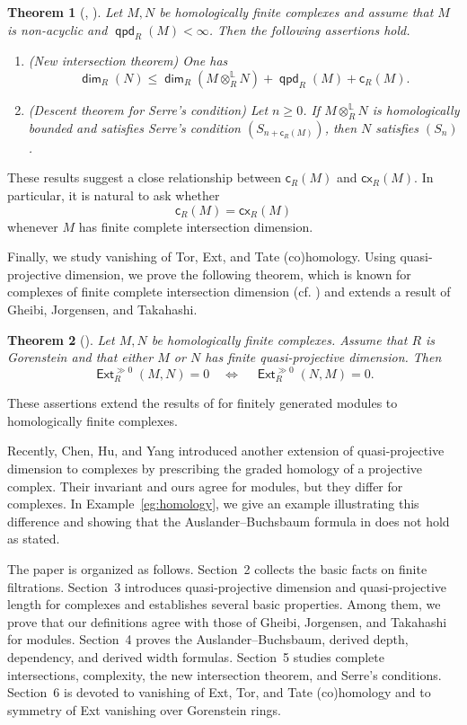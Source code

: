 \documentclass[10pt, a4paper,reqno]{amsart}
\newtheorem{thm}{Theorem}[section]
\theoremstyle{definition}
\theoremstyle{remark}
\numberwithin{equation}{thm}
\def\c{\mathsf{c}}
\def\dim{\operatorname{\mathsf{dim}}}
\def\Ext{\operatorname{\mathsf{Ext}}}
\def\ltensor{\otimes^{\mathbb{L}}}
\def\cx{\mathsf{cx}}
\def\qpd{\operatorname{\mathsf{qpd}}}
\begin{document}
\begin{thm}[, ]
Let $M,N$ be homologically finite complexes and assume that $M$ is non-acyclic and $\qpd_R(M)<\infty$.
Then the following assertions hold.
\begin{enumerate}[\rm(1)]
\item
{\rm(New intersection theorem)}
One has
\[
\dim_R(N)
\leq
\dim_R(M\ltensor_RN)
+\qpd_R(M)+\c_R(M).
\]

\item {\rm(Descent theorem for Serre's condition)}
Let $n\geq0$.
If $M\ltensor_RN$ is homologically bounded and satisfies Serre's condition
$(S_{n+\c_R(M)})$, then $N$ satisfies $(S_n)$.
\end{enumerate}
\end{thm}

These results suggest a close relationship between $\c_R(M)$ and $\cx_R(M)$.
In particular, it is natural to ask whether
\[
\c_R(M)=\cx_R(M)
\]
whenever $M$ has finite complete intersection dimension.

Finally, we study vanishing of Tor, Ext, and Tate (co)homology.
Using quasi-projective dimension, we prove the following theorem, which is known for complexes of finite complete intersection dimension (cf. \cite[Theorem 4.1]{Jor}) and extends a result of Gheibi, Jorgensen, and Takahashi. 

\begin{thm}[]
Let $M,N$ be homologically finite complexes.
Assume that $R$ is Gorenstein and that either $M$ or $N$ has finite quasi-projective dimension.
Then
\[
\Ext_R^{\gg0}(M,N)=0
\quad\Longleftrightarrow\quad
\Ext_R^{\gg0}(N,M)=0.
\]
\end{thm}
\noindent
These assertions extend the results of \cite{GJT} for finitely generated modules to homologically finite complexes.

Recently, Chen, Hu, and Yang \cite{CHY} introduced another extension of quasi-projective dimension to complexes by prescribing the graded homology of a projective complex.
Their invariant and ours agree for modules, but they differ for complexes.
In Example~\ref{eg:homology}, we give an example illustrating this difference and showing that the Auslander--Buchsbaum formula in \cite[Theorem~4.4]{CHY} does not hold as stated.

The paper is organized as follows.
Section~2 collects the basic facts on finite filtrations.
Section~3 introduces quasi-projective dimension and quasi-projective length for complexes and establishes several basic properties. 
Among them, we prove that our definitions agree with those of Gheibi, Jorgensen, and Takahashi for modules. 
Section~4 proves the Auslander--Buchsbaum, derived depth, dependency, and derived width formulas.
Section~5 studies complete intersections, complexity, the new intersection theorem, and Serre's conditions.
Section~6 is devoted to vanishing of Ext, Tor, and Tate (co)homology and to symmetry of Ext vanishing over Gorenstein rings.
\end{document}
